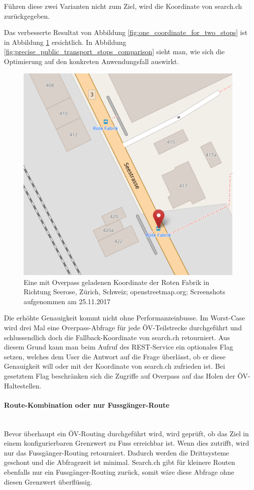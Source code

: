 Führen diese zwei Varianten nicht zum Ziel, wird die Koordinate von search.ch zurückgegeben.

Das verbesserte Resultat von Abbildung \ref{fig:one_coordinate_for_two_stops} ist in Abbildung \ref{fig:one_coordinate_for_two_stops_improved} ersichtlich. In Abbildung \ref{fig:precise_public_transport_stops_comparison} sieht man, wie sich die Optimierung auf den konkreten Anwendungsfall auswirkt.

\begin{figure}[ht]
    \centering
    \includegraphics[width=0.5\linewidth]{projectdoc/img/one_coordinate_for_two_stops_improved}
    \caption[mit Overpass geladenen Koordinate]{Eine mit Overpass geladenen Koordinate der Roten Fabrik in Richtung Seerose, Zürich, Schweiz; openstreetmap.org; Screenshots aufgenommen am 25.11.2017}
    \label{fig:one_coordinate_for_two_stops_improved}
\end{figure}


Die erhöhte Genauigkeit kommt nicht ohne Performanzeinbusse. Im Worst-Case wird drei Mal eine Overpass-Abfrage \cite{wiki:overpass} für jede ÖV-Teilstrecke durchgeführt und schlussendlich doch die Fallback-Koordinate von search.ch \cite{search_ch_route_api} retourniert. Aus diesem Grund kann man beim Aufruf des \ac{REST}-Service ein optionales Flag setzen, welches dem User die Antwort auf die Frage überlässt, ob er diese Genauigkeit will oder mit der Koordinate von search.ch \cite{search_ch_route_api} zufrieden ist. Bei gesetztem Flag beschränken sich die Zugriffe auf Overpass \cite{wiki:overpass} auf das Holen der ÖV-Haltestellen.

\paragraph{Route-Kombination oder nur Fussgänger-Route}\label{impl:Route-Kombination oder nur Fussgänger-Route}~\\
Bevor überhaupt ein ÖV-Routing durchgeführt wird, wird geprüft, ob das Ziel in einem konfigurierbaren Grenzwert zu Fuss erreichbar ist. Wenn dies zutrifft, wird nur das Fussgänger-Routing retourniert. Dadurch werden die Drittsysteme geschont und die Abfragezeit ist minimal. Search.ch \cite{search_ch_route_api} gibt für kleinere Routen ebenfalls nur ein Fussgänger-Routing zurück, somit wäre diese Abfrage ohne diesen Grenzwert überflüssig.

